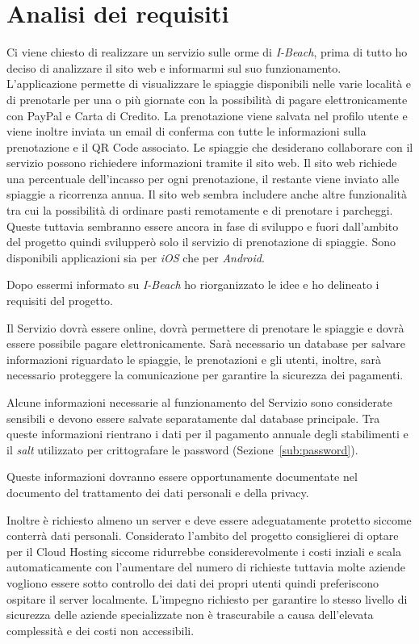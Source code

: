 \section{Analisi dei requisiti}
Ci viene chiesto di realizzare un servizio sulle orme di \emph{I-Beach}, prima di tutto ho deciso di analizzare il sito web e informarmi sul suo funzionamento. L'applicazione permette di visualizzare le spiaggie disponibili nelle varie localit\`a e di prenotarle per una o pi\`u giornate con la possibilit\`a di pagare elettronicamente con PayPal e Carta di Credito. La prenotazione viene salvata nel profilo utente e viene inoltre inviata un email di conferma con tutte le informazioni sulla prenotazione e il QR Code associato. Le spiaggie che desiderano collaborare con il servizio possono richiedere informazioni tramite il sito web. Il sito web richiede una percentuale dell'incasso per ogni prenotazione, il restante viene inviato alle spiaggie a ricorrenza annua. Il sito web sembra includere anche altre funzionalit\`a tra cui la possibilit\`a di ordinare pasti remotamente e di prenotare i parcheggi. Queste tuttavia sembranno essere ancora in fase di sviluppo e fuori dall'ambito del progetto quindi svilupper\`o solo il servizio di prenotazione di spiaggie. Sono disponibili applicazioni sia per \emph{iOS} che per \emph{Android}. 

Dopo essermi informato su \emph{I-Beach} ho riorganizzato le idee e ho delineato i requisiti del progetto.

Il Servizio dovr\`a essere online, dovr\`a permettere di prenotare le spiaggie e dovr\`a essere possibile pagare elettronicamente. Sar\`a necessario un database per salvare informazioni riguardato le spiaggie, le prenotazioni e gli utenti, inoltre, sar\`a necessario proteggere la comunicazione per garantire la sicurezza dei pagamenti.

Alcune informazioni necessarie al funzionamento del Servizio sono considerate sensibili e devono essere salvate separatamente dal database principale. Tra queste informazioni rientrano i dati per il pagamento annuale degli stabilimenti e il \emph{salt} utilizzato per crittografare le password (Sezione~\ref{sub:password}).

Queste informazioni dovranno essere opportunamente documentate nel documento del trattamento dei dati personali e della privacy. 

Inoltre \`e richiesto almeno un server e deve essere adeguatamente protetto siccome conterr\`a dati personali. Considerato l'ambito del progetto consiglierei di optare per il Cloud Hosting siccome ridurrebbe considerevolmente i costi inziali e scala automaticamente con l'aumentare del numero di richieste tuttavia molte aziende vogliono essere sotto controllo dei dati dei propri utenti quindi preferiscono ospitare il server localmente. L'impegno richiesto per garantire lo stesso livello di sicurezza delle aziende specializzate non \`e trascurabile a causa dell'elevata complessit\`a e dei costi non accessibili.
